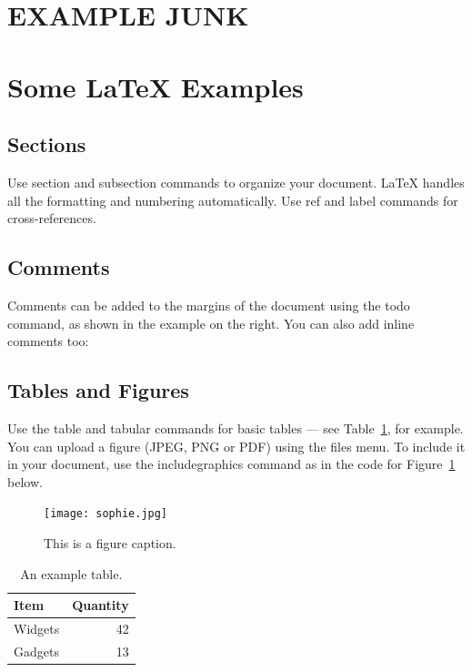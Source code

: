 \documentclass[12pt]{article}
\begin{document}
\section{EXAMPLE JUNK}



\section{Some \LaTeX{} Examples}
\label{sec:examples}

\subsection{Sections}

Use section and subsection commands to organize your document. \LaTeX{} handles all the formatting and numbering automatically. Use ref and label commands for cross-references.

\subsection{Comments}

Comments can be added to the margins of the document using the  todo command, as shown in the example on the right. You can also add inline comments too:


\subsection{Tables and Figures}

Use the table and tabular commands for basic tables --- see Table~\ref{tab:widgets}, for example. You can upload a figure (JPEG, PNG or PDF) using the files menu. To include it in your document, use the includegraphics command as in the code for Figure~\ref{fig:sophie} below.

\begin{figure}
\centering
\texttt{[image: sophie.jpg]}
\caption{\label{fig:sophie}This is a figure caption.}
\end{figure}

\begin{table}
\centering
\begin{tabular}{l|r}
Item & Quantity \\\hline
Widgets & 42 \\
Gadgets & 13
\end{tabular}
\caption{\label{tab:widgets}An example table.}
\end{table}
\end{document}
